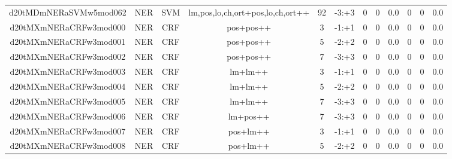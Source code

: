 \documentclass[a4paper]{article}
\begin{document}
\begin{landscape}
\begin{center}
\begin{tabular}{ |c|c|c|c|c|c|c|c|c|c|c|c|}
 
 	
 	\small{ d20tMDmNERaSVMw5mod062 } & \small{ NER} & \small{  SVM }  & lm,pos,lo,ch,ort+pos,lo,ch,ort++  &  92 &  \small{  -3:+3 }  &  0 & 0 & 0.0  &  0 & 0 & 0.0 \\
 	

 
 	
 	\small{ d20tMXmNERaCRFw3mod000 } & \small{ NER} & \small{  CRF }  & pos+pos++  &  3 &  \small{  -1:+1 }  &  0 & 0 & 0.0  &  0 & 0 & 0.0 \\
 	

 
 	
 	\small{ d20tMXmNERaCRFw3mod001 } & \small{ NER} & \small{  CRF }  & pos+pos++  &  5 &  \small{  -2:+2 }  &  0 & 0 & 0.0  &  0 & 0 & 0.0 \\
 	

 
 	
 	\small{ d20tMXmNERaCRFw3mod002 } & \small{ NER} & \small{  CRF }  & pos+pos++  &  7 &  \small{  -3:+3 }  &  0 & 0 & 0.0  &  0 & 0 & 0.0 \\
 	

 
 	
 	\small{ d20tMXmNERaCRFw3mod003 } & \small{ NER} & \small{  CRF }  & lm+lm++  &  3 &  \small{  -1:+1 }  &  0 & 0 & 0.0  &  0 & 0 & 0.0 \\
 	

 
 	
 	\small{ d20tMXmNERaCRFw3mod004 } & \small{ NER} & \small{  CRF }  & lm+lm++  &  5 &  \small{  -2:+2 }  &  0 & 0 & 0.0  &  0 & 0 & 0.0 \\
 	

 
 	
 	\small{ d20tMXmNERaCRFw3mod005 } & \small{ NER} & \small{  CRF }  & lm+lm++  &  7 &  \small{  -3:+3 }  &  0 & 0 & 0.0  &  0 & 0 & 0.0 \\
 	

 
 	
 	\small{ d20tMXmNERaCRFw3mod006 } & \small{ NER} & \small{  CRF }  & lm+pos++  &  7 &  \small{  -3:+3 }  &  0 & 0 & 0.0  &  0 & 0 & 0.0 \\
 	

 
 	
 	\small{ d20tMXmNERaCRFw3mod007 } & \small{ NER} & \small{  CRF }  & pos+lm++  &  3 &  \small{  -1:+1 }  &  0 & 0 & 0.0  &  0 & 0 & 0.0 \\
 	

 
 	
 	\small{ d20tMXmNERaCRFw3mod008 } & \small{ NER} & \small{  CRF }  & pos+lm++  &  5 &  \small{  -2:+2 }  &  0 & 0 & 0.0  &  0 & 0 & 0.0 \\
 	


\end{tabular}
\end{center}
\end{landscape}
\end{document}
